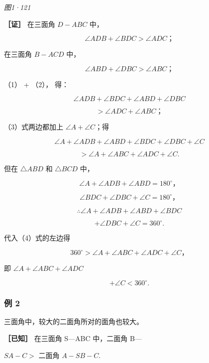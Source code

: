 \emph{图1·121}

\textbf{［证］} 在三面角 \(D - ABC\) 中，

\[
\angle A D B + \angle B D C > \angle A D C\text{；} \tag {1}
\]

在三面角 \(B - ACD\) 中，

\[
\angle A B D + \angle D B C > \angle A B C\text{；} \tag {2}
\]

（1） + （2）， 得：

\[
\angle A D B + \angle B D C + \angle A B D + \angle D B C
\]

\[
> \angle A D C + \angle A B C\text{；} \tag {3}
\]

（3）式两边都加上 \(\angle A + \angle C\)；得

\[
\angle A + \angle A D B + \angle A B D + \angle B D C + \angle D B C + \angle C
\]

\[
> \angle A + \angle A B C + \angle A D C + \angle C. \tag {4}
\]

但在 \(\triangle ABD\) 和 \(\triangle BCD\) 中，

\[
\angle A + \angle A D B + \angle A B D = 180^{\circ}\text{，}
\]

\[
\angle B D C + \angle D B C + \angle C = 180^{\circ}\text{，}
\]

\[
\therefore \angle A + \angle A D B + \angle A B D + \angle B D C
\]

\[
+ \angle D B C + \angle C = 360^{\circ}.
\]

代入（4）式的左边得

\[
360^{\circ} > \angle A + \angle A B C + \angle A D C + \angle C\text{，}
\]

即 \(\angle A + \angle ABC + \angle ADC\)

\[
+ \angle C <   360^{\circ}.
\]

\subsubsection{例 2}

三面角中，较大的二面角所对的面角也较大。

\textbf{［已知］} 在三面角 S---ABC 中，二面角 B---

\(SA - C >\) 二面角 \(A - SB - C.\)

